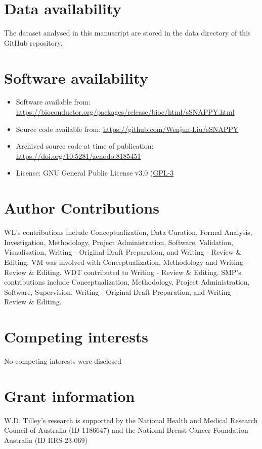\documentclass[9pt,a4paper,]{extarticle}
\begin{document}
\hypertarget{data-availability}{%
\section{Data availability}\label{data-availability}}

The dataset analysed in this manuscript are stored in the data directory of this GitHub repository.

\hypertarget{software-availability}{%
\section{Software availability}\label{software-availability}}

\begin{itemize}
\item
  Software available from: \url{https://bioconductor.org/packages/release/bioc/html/sSNAPPY.html}
\item
  Source code available from: \url{https://github.com/Wenjun-Liu/sSNAPPY}
\item
  Archived source code at time of publication: \url{https://doi.org/10.5281/zenodo.8185451}
\item
  License: GNU General Public License v3.0 (\href{https://opensource.org/license/gpl-3-0/}{GPL-3}
\end{itemize}

\hypertarget{author-contributions}{%
\section{Author Contributions}\label{author-contributions}}

WL's contributions include Conceptualization, Data Curation, Formal Analysis, Investigation, Methodology, Project Administration, Software, Validation, Visualisation, Writing - Original Draft Preparation, and Writing - Review \& Editing.
VM was involved with Conceptualization, Methodology and Writing - Review \& Editing.
WDT contributed to Writing - Review \& Editing.
SMP's contributions include Conceptualization, Methodology, Project Administration, Software, Supervision, Writing - Original Draft Preparation, and Writing - Review \& Editing.

\hypertarget{competing-interests}{%
\section{Competing interests}\label{competing-interests}}

No competing interests were disclosed

\hypertarget{grant-information}{%
\section{Grant information}\label{grant-information}}

W.D. Tilley's research is supported by the National Health and Medical Research Council of Australia (ID 1186647) and the National Breast Cancer Foundation Australia (ID IIRS-23-069)

\renewcommand\refname{References}
{\small}
\end{document}
